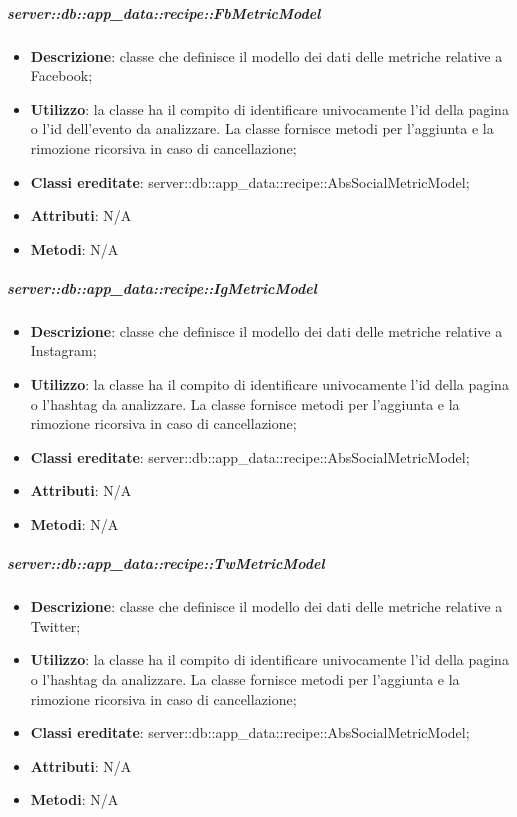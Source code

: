 		\subparagraph{server::db::app\_data::recipe::FbMetricModel} %
		\label{subp:server_db_app_data_recipe_fbmetricmodel}
			\begin{itemize}
				\item \textbf{Descrizione}: classe che definisce il modello dei dati delle metriche relative a Facebook;
				\item \textbf{Utilizzo}: la classe ha il compito di identificare univocamente l'id della pagina o l'id dell'evento da analizzare. La classe fornisce metodi per l'aggiunta e la rimozione ricorsiva in caso di cancellazione;
				\item \textbf{Classi ereditate}: server::db::app\_data::recipe::AbsSocialMetricModel;
				\item \textbf{Attributi}: N/A
				\item \textbf{Metodi}: N/A
			\end{itemize}


		\subparagraph{server::db::app\_data::recipe::IgMetricModel} %
		\label{subp:server_db_app_data_recipe_igmetricmodel}
			\begin{itemize}
				\item \textbf{Descrizione}: classe che definisce il modello dei dati delle metriche relative a Instagram;
				\item \textbf{Utilizzo}: la classe ha il compito di identificare univocamente l'id della pagina o l'hashtag da analizzare. La classe fornisce metodi per l'aggiunta e la rimozione ricorsiva in caso di cancellazione;
				\item \textbf{Classi ereditate}: server::db::app\_data::recipe::AbsSocialMetricModel;
				\item \textbf{Attributi}: N/A
				\item \textbf{Metodi}: N/A
			\end{itemize}


		\subparagraph{server::db::app\_data::recipe::TwMetricModel} %
		\label{subp:server_db_app_data_recipe_twmetricmodel}
			\begin{itemize}
				\item \textbf{Descrizione}: classe che definisce il modello dei dati delle metriche relative a Twitter;
				\item \textbf{Utilizzo}: la classe ha il compito di identificare univocamente l'id della pagina o l'hashtag da analizzare. La classe fornisce metodi per l'aggiunta e la rimozione ricorsiva in caso di cancellazione;
				\item \textbf{Classi ereditate}: server::db::app\_data::recipe::AbsSocialMetricModel;
				\item \textbf{Attributi}: N/A
				\item \textbf{Metodi}: N/A
			\end{itemize}
